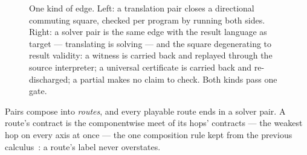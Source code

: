 \begin{figure}
\centering
{}
\caption{One kind of edge. Left: a translation pair closes a
directional commuting square, checked per program by running both
sides. Right: a solver pair is the same edge with the result
language as target --- translating is solving --- and the square
degenerating to result validity: a witness is carried back and
replayed through the source interpreter; a universal certificate is
carried back and re-discharged; a partial makes no claim to check.
Both kinds pass one gate.}
\label{fig:edges}
\end{figure}

Pairs compose into \emph{routes}, and every playable route ends in a
solver pair. A route's contract is the componentwise meet of its
hops' contracts --- the weakest hop on every axis at once --- the
one composition rule kept from the previous
calculus~\citep{hurdygurdy2026calculus}: a route's label never
overstates.

